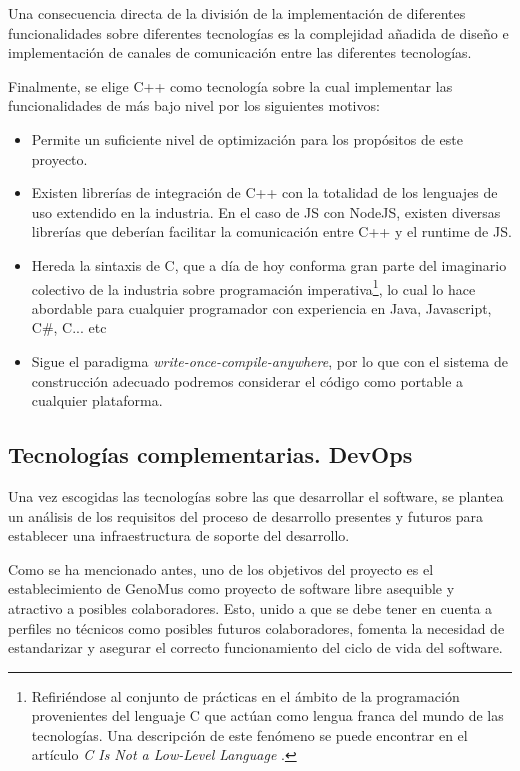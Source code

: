 Una consecuencia directa de la división de la implementación de diferentes funcionalidades sobre diferentes tecnologías es la complejidad añadida de diseño e implementación de canales de comunicación entre las diferentes tecnologías.

Finalmente, se elige C++ como tecnología sobre la cual implementar las funcionalidades de más bajo nivel por los siguientes motivos:

\begin{itemize}
    \item Permite un suficiente nivel de optimización para los propósitos de este proyecto.
    \item Existen librerías de integración de C++ con la totalidad de los lenguajes de uso extendido en la industria. En el caso de JS con NodeJS, existen diversas librerías que deberían facilitar la comunicación entre C++ y el runtime de JS.
    \item Hereda la sintaxis de C, que a día de hoy conforma gran parte del imaginario colectivo de la industria sobre programación imperativa\footnote{
        Refiriéndose al conjunto de prácticas en el ámbito de la programación provenientes del lenguaje C que actúan como lengua franca del mundo de las tecnologías. Una descripción de este fenómeno se puede encontrar en el artículo \textit{C Is Not a Low-Level Language} \cite{C-is-not-a-language}.
    }, lo cual lo hace abordable para cualquier programador con experiencia en Java, Javascript, C\#, C... etc
    \item Sigue el paradigma \textit{write-once-compile-anywhere}, por lo que con el sistema de construcción adecuado podremos considerar el código como portable a cualquier plataforma.
\end{itemize}

\subsection{Tecnologías complementarias. DevOps}

Una vez escogidas las tecnologías sobre las que desarrollar el software, se plantea un análisis de los requisitos del proceso de desarrollo presentes y futuros para establecer una infraestructura de soporte del desarrollo.

Como se ha mencionado antes, uno de los objetivos del proyecto es el establecimiento de GenoMus como proyecto de software libre asequible y atractivo a posibles colaboradores. Esto, unido a que se debe tener en cuenta a perfiles no técnicos como posibles futuros colaboradores, fomenta la necesidad de estandarizar y asegurar el correcto funcionamiento del ciclo de vida del software.

